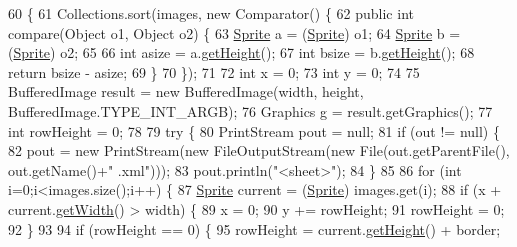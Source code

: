 \begin{DoxyCode}
60                                                                                                            
         \{
61         Collections.sort(images, \textcolor{keyword}{new} Comparator() \{
62             \textcolor{keyword}{public} \textcolor{keywordtype}{int} compare(Object o1, Object o2) \{
63                 \mbox{\hyperlink{class_sprite}{Sprite}} a = (\mbox{\hyperlink{class_sprite}{Sprite}}) o1;
64                 \mbox{\hyperlink{class_sprite}{Sprite}} b = (\mbox{\hyperlink{class_sprite}{Sprite}}) o2;
65                 
66                 \textcolor{keywordtype}{int} asize = a.\mbox{\hyperlink{classorg_1_1newdawn_1_1slick_1_1_image_aa2594a93f5126f60ad8a72444fceee98}{getHeight}}();
67                 \textcolor{keywordtype}{int} bsize = b.\mbox{\hyperlink{classorg_1_1newdawn_1_1slick_1_1_image_aa2594a93f5126f60ad8a72444fceee98}{getHeight}}();
68                 \textcolor{keywordflow}{return} bsize - asize;
69             \}
70         \});
71         
72         \textcolor{keywordtype}{int} x = 0;
73         \textcolor{keywordtype}{int} y = 0;
74         
75         BufferedImage result = \textcolor{keyword}{new} BufferedImage(width, height, BufferedImage.TYPE\_INT\_ARGB);
76         Graphics g = result.getGraphics();
77         \textcolor{keywordtype}{int} rowHeight = 0;
78         
79         \textcolor{keywordflow}{try} \{
80             PrintStream pout = null;
81             \textcolor{keywordflow}{if} (out != null) \{
82                 pout = \textcolor{keyword}{new} PrintStream(\textcolor{keyword}{new} FileOutputStream(\textcolor{keyword}{new} File(out.getParentFile(), out.getName()+\textcolor{stringliteral}{"
      .xml"})));
83                 pout.println(\textcolor{stringliteral}{"<sheet>"});
84             \}
85             
86             \textcolor{keywordflow}{for} (\textcolor{keywordtype}{int} i=0;i<images.size();i++) \{
87                 \mbox{\hyperlink{class_sprite}{Sprite}} current = (\mbox{\hyperlink{class_sprite}{Sprite}}) images.get(i);
88                 \textcolor{keywordflow}{if} (x + current.\mbox{\hyperlink{classorg_1_1newdawn_1_1slick_1_1_image_a94a5d32276e8a27930480223c5d69e11}{getWidth}}() > width) \{
89                     x = 0;
90                     y += rowHeight;
91                     rowHeight = 0;
92                 \}
93                 
94                 \textcolor{keywordflow}{if} (rowHeight == 0) \{
95                     rowHeight = current.\mbox{\hyperlink{classorg_1_1newdawn_1_1slick_1_1_image_aa2594a93f5126f60ad8a72444fceee98}{getHeight}}() + border;

\end{DoxyCode}
